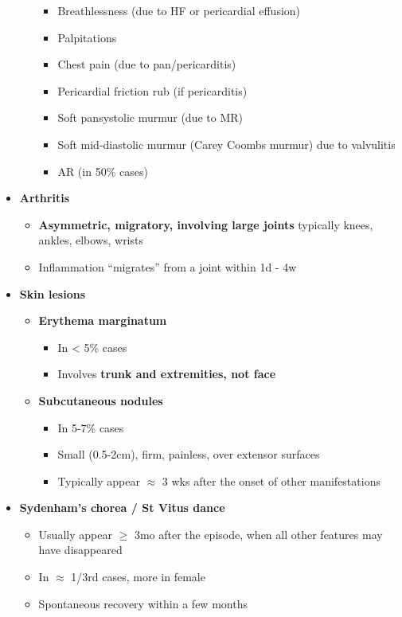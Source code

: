 \documentclass[
  12pt,
]{memoir}
\providecommand{\tightlist}{%
  \setlength{\itemsep}{0pt}\setlength{\parskip}{0pt}}
\begin{document}
\begin{itemize}
\begin{itemize}
    \begin{itemize}
    \tightlist
    \item
      Breathlessness (due to HF or pericardial effusion)
    \item
      Palpitations
    \item
      Chest pain (due to pan/pericarditis)
    \item
      Pericardial friction rub (if pericarditis)
    \item
      Soft pansystolic murmur (due to MR)
    \item
      Soft mid-diastolic murmur (Carey Coombs murmur) due to valvulitis
    \item
      AR (in 50\% cases)
    \end{itemize}
  \end{itemize}
\item
  \textbf{Arthritis}

  \begin{itemize}
  \tightlist
  \item
    \textbf{Asymmetric, migratory, involving large joints} typically
    knees, ankles, elbows, wrists
  \item
    Inflammation ``migrates'' from a joint within 1d - 4w
  \end{itemize}
\item
  \textbf{Skin lesions}

  \begin{itemize}
  \tightlist
  \item
    \textbf{Erythema marginatum}

    \begin{itemize}
    \tightlist
    \item
      In \textless{} 5\% cases
    \item
      Involves \textbf{trunk and extremities, not face}
    \end{itemize}
  \item
    \textbf{Subcutaneous nodules}

    \begin{itemize}
    \tightlist
    \item
      In 5-7\% cases
    \item
      Small (0.5-2cm), firm, painless, over extensor surfaces
    \item
      Typically appear \(\approx\) 3 wks after the onset of other
      manifestations
    \end{itemize}
  \end{itemize}
\item
  \textbf{Sydenham's chorea / St Vitus dance}

  \begin{itemize}
  \tightlist
  \item
    Usually appear \(\ge\) 3mo after the episode, when all other
    features may have disappeared
  \item
    In \(\approx\) 1/3rd cases, more in female
  \item
    Spontaneous recovery within a few months
  \end{itemize}
\end{itemize}
\end{document}
